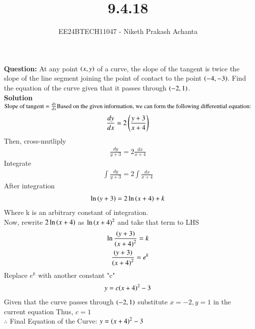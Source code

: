 \documentclass[journal]{IEEEtran}
\renewcommand{\thefigure}{\theenumi}
\renewcommand{\thetable}{\theenumi}
\numberwithin{equation}{enumi}
\numberwithin{figure}{enumi}
\renewcommand{\thetable}{\theenumi}
\begin{document}

\vspace{3cm}

\title{9.4.18}
\author{EE24BTECH11047 - Niketh Prakash Achanta}
{\let\newpage\relax\maketitle}
\renewcommand{\thefigure}{\theenumi}
\renewcommand{\thetable}{\theenumi}

\textbf{Question:} At any point $\left(x,y\right)$ of a curve, the slope of the tangent is twice the slope of the line segment joining the point of contact to the point $\left(-4,-3\right)$. Find the equation of the curve given that it passes through $\left(-2,1\right)$.\\

\textbf{Solution}\\
    $\text{Slope of tangent} = \frac{dy}{dx}\\ 
    \text{Based on the given information, we can form the following differential equation:}$ \\
    \begin{align*}
    \frac{dy}{dx}=2\left(\frac{y+3}{x+4}\right)     
    \end{align*}
Then, cross-mutliply 
    \begin{align*}
        \frac{dy}{y+3}=2\frac{dx}{x+4}
    \end{align*}
Integrate
    \begin{align*}
        \int{\frac{dy}{y+3}}=2\int{\frac{dx}{x+4}}
    \end{align*}
After integration
    \begin{align*}
        \ln{\ensuremath{\left(y+3\right)}}=2\ln{\ensuremath{\left(x+4\right)}}+k    
    \end{align*}
Where k is an arbitrary constant of integration.\\
Now, rewrite $2\ln{\ensuremath{\left(x+4\right)}}$ as ${\ln{\ensuremath{\left(x+4\right)}}}^2$ and take that term to LHS
    \begin{align*}
        \ln{\frac{\ensuremath{\left(y+3\right)}}{{\ensuremath{\left(x+4\right)}}^2}}=k\\
        \frac{\left(y+3\right)}{{\left(x+4\right)}^2}={e}^k
    \end{align*}
Replace $e^k$ with another constant "c"
    \begin{align*}
        y=c{\left(x+4\right)}^2 - 3
    \end{align*}
Given that the curve passes through $\left(-2,1\right)$ substitute $x=-2,y=1$ in the current equation
Thus, $c=1$\\
$\therefore$ Final Equation of the Curve: $y={\left(x+4\right)}^2 - 3$
\end{document}
